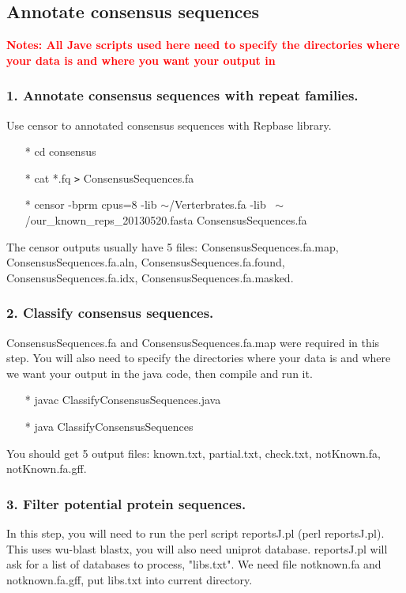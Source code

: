 \documentclass[12pt]{report}
\begin{document}
\subsection*{Annotate consensus sequences}
\textbf{\textcolor{red}{Notes: All Jave scripts used here need to specify the directories where your data is and where you want your output in }}
\subsubsection{1. Annotate consensus sequences with repeat families.}
Use censor to annotated consensus sequences with Repbase library. 
\begin{enumerate}
	\item[*] cd consensus
	\item[*] cat *.fq \texttt{>} ConsensusSequences.fa 
	\item[*] censor -bprm cpus=8 -lib $\sim$/Verterbrates.fa -lib ~$\sim$/our\_known\_reps\_20130520.fasta ConsensusSequences.fa 
\end{enumerate}
The censor outputs usually have 5 files: ConsensusSequences.fa.map, ConsensusSequences.fa.aln, ConsensusSequences.fa.found, ConsensusSequences.fa.idx, ConsensusSequences.fa.masked.  \\

\subsubsection{2. Classify consensus sequences.}
ConsensusSequences.fa and ConsensusSequences.fa.map were required in this step. You will also need to specify the directories where your data is and where we want your output in the java code, then compile and run it.\\
\begin{enumerate}
	\item[*] javac ClassifyConsensusSequences.java
	\item[*] java ClassifyConsensusSequences
\end{enumerate}
You should get 5 output files: known.txt, partial.txt, check.txt, notKnown.fa, notKnown.fa.gff.

\subsubsection{3. Filter potential protein sequences.}
In this step, you will need to run the perl script reportsJ.pl (perl reportsJ.pl). This uses wu-blast blastx, you will also need uniprot database. reportsJ.pl will ask for a list of databases to process, "libs.txt". We need file notknown.fa and notknown.fa.gff, put libs.txt into current directory.
\end{document}
